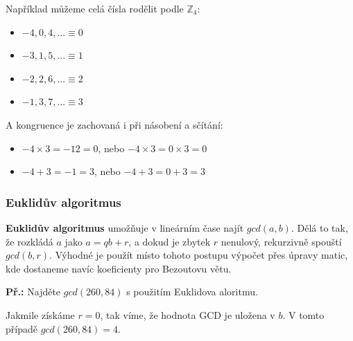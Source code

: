Například můžeme celá čísla rodělit podle $\mathbb{Z}_4$:
\begin{itemize}
\item ${-4, 0, 4, ...} \equiv  0$
\item ${-3, 1, 5, ...} \equiv  1$
\item ${-2, 2, 6, ...} \equiv  2$
\item ${-1, 3, 7, ...} \equiv  3$
\end{itemize}

A kongruence je zachovaná i při násobení a sčítání:

\begin{itemize}
\item $-4 \times 3 = -12 = 0$, nebo $-4 \times 3 = 0 \times 3 = 0$ 
\item $-4 + 3 = -1 = 3$, nebo $-4 + 3 = 0 + 3 = 3$ 
\end{itemize}

\subsubsection{Euklidův algoritmus}
\textbf{Euklidův algoritmus} umožňuje v lineárním čase najít $gcd(a,b)$. Dělá to
tak, že rozkládá $a$ jako $a = qb + r$, a dokud je zbytek $r$ nenulový,
rekurzivně spouští $gcd(b,r)$. Výhodné je použít místo tohoto postupu výpočet
přes úpravy matic, kde dostaneme navíc koeficienty pro Bezoutovu větu.

\begin{exercise}

\textbf{Př.:} Najděte $gcd(260, 84)$ s použitím Euklidova aloritmu.

\begin{center}
\end{center}

Jakmile získáme $r = 0$, tak víme, že hodnota GCD je uložena v $b$. V tomto
případě $gcd(260, 84) = 4$.

\end{exercise}

